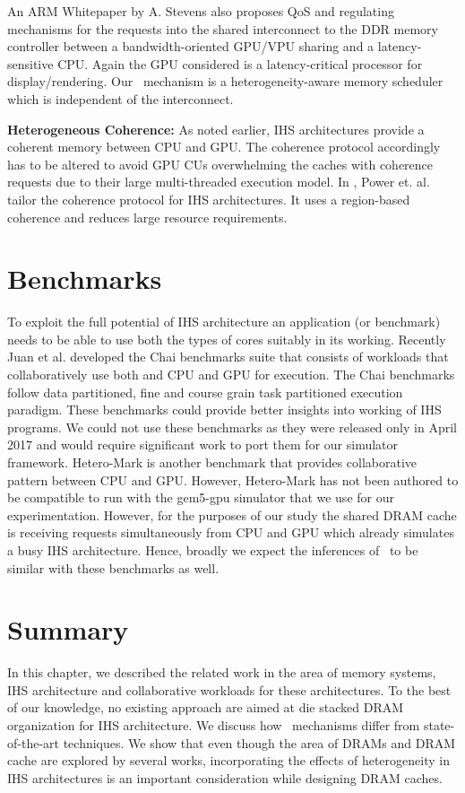 An ARM Whitepaper by A. Stevens \cite{qos-arm} also proposes QoS and regulating mechanisms for the requests into the shared interconnect to the DDR memory controller between a bandwidth-oriented GPU/VPU sharing and a latency-sensitive CPU. Again the GPU considered is a latency-critical processor for display/rendering. Our \prioname\ mechanism is a heterogeneity-aware memory scheduler which is independent of the interconnect.
\par \textbf{Heterogeneous Coherence:} As noted earlier, IHS architectures provide a coherent memory between CPU and GPU. The coherence protocol accordingly has to be altered to avoid GPU CUs overwhelming the caches with coherence requests due to their large multi-threaded execution model. In \cite{hsc-coherence}, Power et. al. tailor the coherence protocol for IHS architectures. It uses a region-based coherence and reduces large resource requirements.

\section{Benchmarks} \label{related-work-benchmarks}
To exploit the full potential of IHS architecture an application (or benchmark) needs to be able to use both the types of cores suitably in its working. Recently Juan et al. developed the Chai benchmarks suite \cite{chai} that consists of workloads that collaboratively use both and CPU and GPU for execution. The Chai benchmarks follow data partitioned, fine and course grain task partitioned execution paradigm. These benchmarks could provide better insights into working of IHS programs. We could not use these benchmarks as they were released only in April 2017 and would require significant work to port them for our simulator framework. Hetero-Mark \cite{hetero-mark} is another benchmark that provides collaborative pattern between CPU and GPU. However, Hetero-Mark has not been authored to be compatible to run with the gem5-gpu simulator that we use for our experimentation. However, for the purposes of our study the shared DRAM cache is receiving requests simultaneously from CPU and GPU which already simulates a busy IHS architecture.  Hence, broadly we expect the inferences of \cachename\ to be similar with these benchmarks as well.

\section{Summary}
In this chapter, we described the related work in the area of memory systems, IHS architecture and collaborative workloads for these architectures. To the best of our knowledge, no existing approach are aimed at die stacked DRAM organization for IHS architecture. We discuss how \cachename\ mechanisms differ from state-of-the-art techniques. We show that even though the area of DRAMs and DRAM cache are explored by several works, incorporating the effects of heterogeneity in IHS architectures is an important consideration while designing DRAM caches.